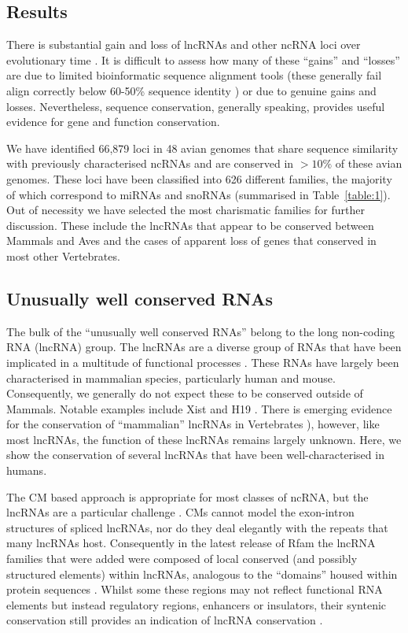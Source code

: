 \documentclass[10pt]{bmc_article}
\newenvironment{bmcformat}{\begin{raggedright}\baselineskip20pt\sloppy\setboolean{publ}{false}}{\end{raggedright}\baselineskip20pt\sloppy}
\begin{document}
\begin{bmcformat}
\section*{Results}

There is substantial gain and loss of lncRNAs and other ncRNA loci
over evolutionary time
\cite{Cabili:2011,Kutter:2012,Hoeppner:2012}. It is difficult to
assess how many of these ``gains'' and ``losses'' are due to limited
bioinformatic sequence alignment tools (these generally fail align
correctly below 60-50\% sequence identity
\cite{Gardner:2005:Nucleic-Acids-Res:15860779}) or due to genuine
gains and losses. Nevertheless, sequence conservation, generally
speaking, provides useful evidence for gene and function conservation.

We have identified 66,879 loci in 48 avian genomes that share sequence
similarity with previously characterised ncRNAs and are conserved in
$>10\%$ of these avian genomes. These loci have been classified into
626 different families, the majority of which correspond to miRNAs and
snoRNAs (summarised in Table~\ref{table:1}). Out of necessity we have
selected the most charismatic families for further discussion. These
include the lncRNAs that appear to be conserved between Mammals and
Aves and the cases of apparent loss of genes that conserved in most
other Vertebrates.


\subsection*{Unusually well conserved RNAs}

The bulk of the ``unusually well conserved RNAs'' belong to the long
non-coding RNA (lncRNA) group.  The lncRNAs are a diverse group of
RNAs that have been implicated in a multitude of functional processes
\cite{Rinn:2007,Chow:2005,Guttman:2009,Ulitsky:2013}. These RNAs have
largely been characterised in mammalian species, particularly human
and mouse. Consequently, we generally do not expect these to be
conserved outside of Mammals. Notable examples include Xist
\cite{Duret:2006} and H19 \cite{Smits:2008}.  There is emerging
evidence for the conservation of ``mammalian'' lncRNAs in Vertebrates
\cite{Chodroff:2010,Ulitsky:2011}), however, like most lncRNAs, the
function of these lncRNAs remains largely unknown. Here, we show the
conservation of several lncRNAs that have been well-characterised in
humans.


The CM based approach is appropriate for most classes of ncRNA, but
the lncRNAs are a particular challenge \cite{Guttman:2009}.  CMs
cannot model the exon-intron structures of spliced lncRNAs, nor do
they deal elegantly with the repeats that many lncRNAs
host. Consequently in the latest release of Rfam the lncRNA families
that were added were composed of local conserved (and possibly
structured elements) within lncRNAs, analogous to the ``domains''
housed within protein sequences \cite{Burge:2013}. Whilst some these
regions may not reflect functional RNA elements but instead regulatory
regions, enhancers or insulators, their syntenic conservation still
provides an indication of lncRNA conservation
\cite{diederichs2014four}.



\end{bmcformat}
\end{document}
